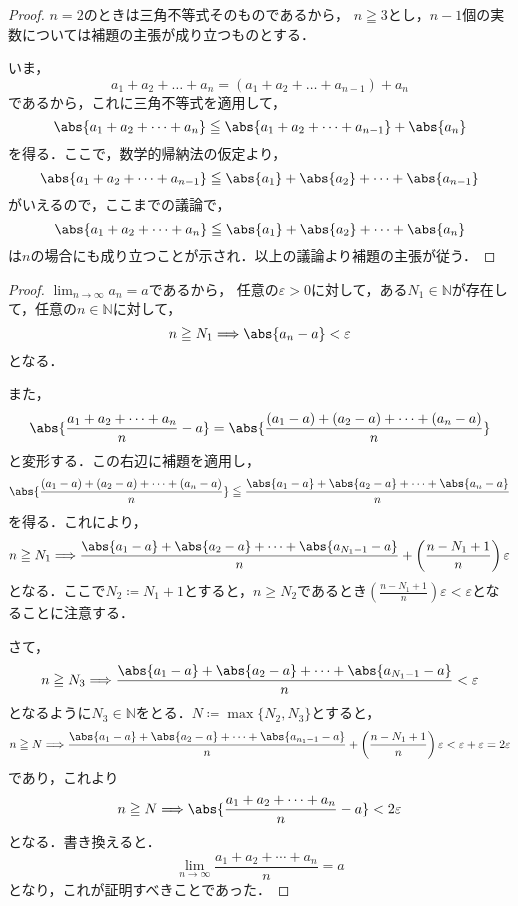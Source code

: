 \documentclass[a4paper,10pt,fleqn]{ltjsarticle}
\begin{document}
\begin{proof}
    $n=2$のときは三角不等式そのものであるから，
    $n \geqq 3$とし，$n-1$個の実数については補題の主張が成り立つものとする．

    いま，
    \[
        a_1 + a_2 + \dots + a_n = (a_1+a_2+\dots+a_{n-1})+a_n
    \]
    であるから，これに三角不等式を適用して，
    \[
        \abs{a_1+a_2+\dots+a_n} \leqq \abs{a_1+a_2+\dots+a_{n-1}} +\abs{a_n}
    \]
    を得る．ここで，数学的帰納法の仮定より，
    \[
        \abs{a_1+a_2+\dots+a_{n-1}} \leqq \abs{a_1}+\abs{a_2}+\dots+\abs{a_{n-1}}
    \]
    がいえるので，ここまでの議論で，
    \[
        \abs{a_1+a_2+\dots+a_n} \leqq \abs{a_1}+\abs{a_2}+\dots+\abs{a_n}
    \]
    は$n$の場合にも成り立つことが示され．以上の議論より補題の主張が従う．
\end{proof}

\begin{tleftbar}
    \begin{proof}
    $\lim_{n \to \infty} a_n =a$であるから，
    任意の$\varepsilon >0$に対して，ある$N_1 \in \mathbb{N}$が存在して，任意の$n \in \mathbb{N}$に対して，
    \[
        n \ge N_1 \Longrightarrow \abs{a_n -a}<\varepsilon 
    \]
    となる．

    また，
    \[
        \abs{\frac{a_1+a_2+\cdots+a_n}{n}-a}= \abs{\frac{(a_1-a)+(a_2-a)+\cdots+(a_n-a)}{n}}
    \]
    と変形する．この右辺に補題を適用し，
    \[
        \abs{\frac{(a_1-a)+(a_2-a)+\cdots+(a_n-a)}{n}} \leqq \frac{\abs{a_1-a}+\abs{a_2-a}+\cdots+\abs{a_n-a}}{n}
    \]
    を得る．これにより，
    \[
        n \ge N_1 \Longrightarrow \frac{\abs{a_1-a}+\abs{a_2-a}+\cdots+\abs{a_{N_1-1}-a}}{n} +\left( \frac{n-N_1+1}{n} \right ) \varepsilon 
    \]
    となる．ここで$N_2 \coloneqq N_1 +1$とすると，$n \ge N_2$であるとき$\left( \frac{n-N_1+1}{n} \right ) \varepsilon < \varepsilon$となることに注意する．
    
    さて，
    \[
        n \ge N_3 \Longrightarrow \frac{\abs{a_1-a}+\abs{a_2-a}+\cdots+\abs{a_{N_1-1}-a}}{n}<\varepsilon
    \]
    となるように$N_3 \in \mathbb{N}$をとる．$N \coloneqq \max \{ N_2 , N_3 \}$とすると，
    \[
        n \ge N \Longrightarrow \frac{\abs{a_1-a}+\abs{a_2-a}+\cdots+\abs{a_{n_1-1}-a}}{n} +\left( \frac{n-N_1+1}{n} \right ) \varepsilon < \varepsilon + \varepsilon = 2 \varepsilon
    \]
    であり，これより
    \[
        n \ge N \Longrightarrow \abs{\frac{a_1+a_2+\cdots+a_n}{n}-a} < 2 \varepsilon
    \]
    となる．書き換えると．
    \[
        \lim_{n \to \infty} \frac{a_1+a_2+\cdots+a_n}{n}=a
    \]
    となり，これが証明すべきことであった．
    \end{proof}
\end{tleftbar}
\end{document}
